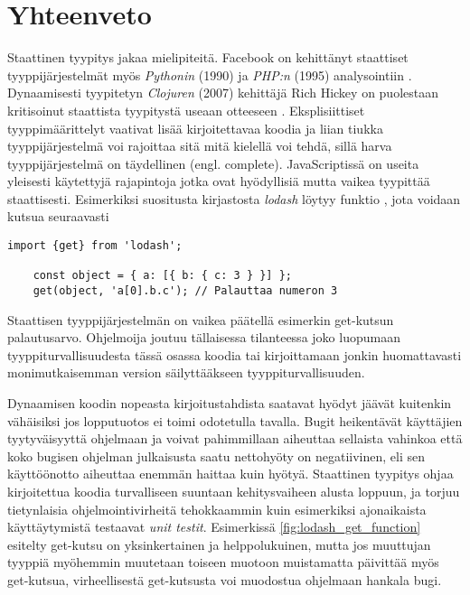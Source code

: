 \chapter{Yhteenveto}
Staattinen tyypitys jakaa mielipiteitä. Facebook on kehittänyt
staattiset tyyppijärjestelmät myös \textit{Pythonin} (1990) ja \textit{PHP:n} (1995)
analysointiin \cite{PyreCheck, HackLang}.
Dynaamisesti tyypitetyn \textit{Clojuren} (2007) kehittäjä
Rich Hickey on puolestaan kritisoinut staattista
tyypitystä useaan otteeseen \cite{10YearsOfClojure}. Eksplisiittiset
tyyppimäärittelyt vaativat lisää kirjoitettavaa koodia ja liian tiukka
tyyppijärjestelmä voi rajoittaa sitä mitä kielellä voi tehdä, sillä harva
tyyppijärjestelmä on täydellinen (engl. complete). JavaScriptissä on useita
yleisesti käytettyjä rajapintoja jotka ovat hyödyllisiä mutta vaikea
tyypittää staattisesti. Esimerkiksi suositusta kirjastosta \textit{lodash}
löytyy funktio  \cite{LodashGet}, jota voidaan kutsua
seuraavasti

\begin{lstlisting}[caption={
	get-funktiolla voidaan palauttaa arvo syvältä
	objektin sisältä välittämättä mahdollisesti puuttuvista arvoista.},
  label={fig:lodash_get_function},
  aboveskip={20pt}
]
	import {get} from 'lodash';

	const object = { a: [{ b: { c: 3 } }] };
	get(object, 'a[0].b.c'); // Palauttaa numeron 3
\end{lstlisting}

Staattisen tyyppijärjestelmän on vaikea päätellä esimerkin get-kutsun
palautusarvo. Ohjelmoija joutuu tällaisessa tilanteessa joko luopumaan
tyyppiturvallisuudesta tässä\newline
osassa koodia tai kirjoittamaan jonkin
huomattavasti monimutkaisemman version säilyttääkseen tyyppiturvallisuuden.

Dynaamisen koodin nopeasta kirjoitustahdista saatavat hyödyt jäävät kuitenkin
vähäisiksi jos lopputuotos ei toimi odotetulla tavalla. Bugit heikentävät
käyttäjien tyytyväisyyttä ohjelmaan ja voivat pahimmillaan aiheuttaa sellaista
vahinkoa että koko bugisen ohjelman julkaisusta saatu nettohyöty on negatiivinen,
eli sen käyttöönotto aiheuttaa enemmän haittaa kuin hyötyä. Staattinen tyypitys
ohjaa kirjoitettua koodia turvalliseen suuntaan kehitysvaiheen alusta
loppuun, ja torjuu tietynlaisia ohjelmointivirheitä tehokkaammin kuin
esimerkiksi ajonaikaista käyttäytymistä testaavat \textit{unit testit}.
Esimerkissä \ref{fig:lodash_get_function} esitelty get-kutsu on yksinkertainen
ja helppolukuinen, mutta jos muuttujan  tyyppiä myöhemmin
muutetaan toiseen muotoon muistamatta päivittää myös get-kutsua, virheellisestä
get-kutsusta voi muodostua ohjelmaan hankala bugi.

